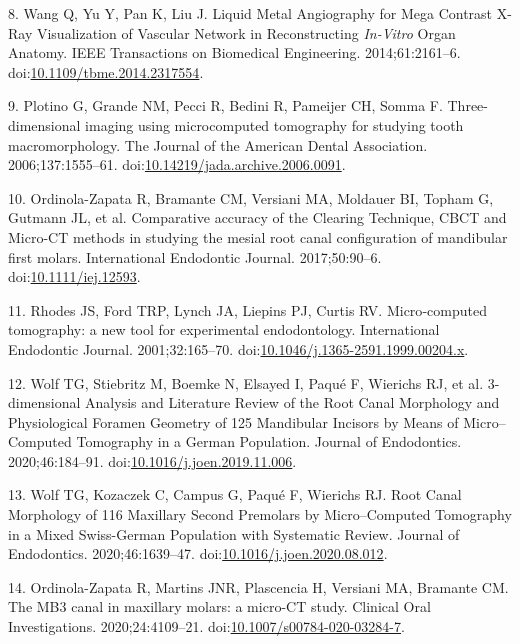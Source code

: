 \documentclass[
  american,
]{article}
\newenvironment{cslreferences}%
  {}%
  {\par}
\begin{document}
\begin{cslreferences}
\leavevmode\hypertarget{ref-6C8eCzkj}{}%
8. Wang Q, Yu Y, Pan K, Liu J. Liquid Metal Angiography for Mega Contrast X-Ray Visualization of Vascular Network in Reconstructing \emph{In-Vitro} Organ Anatomy. IEEE Transactions on Biomedical Engineering. 2014;61:2161--6. doi:\href{https://doi.org/10.1109/tbme.2014.2317554}{10.1109/tbme.2014.2317554}.

\leavevmode\hypertarget{ref-pTcCEU9H}{}%
9. Plotino G, Grande NM, Pecci R, Bedini R, Pameijer CH, Somma F. Three-dimensional imaging using microcomputed tomography for studying tooth macromorphology. The Journal of the American Dental Association. 2006;137:1555--61. doi:\href{https://doi.org/10.14219/jada.archive.2006.0091}{10.14219/jada.archive.2006.0091}.

\leavevmode\hypertarget{ref-PQ2tbZFC}{}%
10. Ordinola-Zapata R, Bramante CM, Versiani MA, Moldauer BI, Topham G, Gutmann JL, et al. Comparative accuracy of the Clearing Technique, CBCT and Micro-CT methods in studying the mesial root canal configuration of mandibular first molars. International Endodontic Journal. 2017;50:90--6. doi:\href{https://doi.org/10.1111/iej.12593}{10.1111/iej.12593}.

\leavevmode\hypertarget{ref-19T8cyNhk}{}%
11. Rhodes JS, Ford TRP, Lynch JA, Liepins PJ, Curtis RV. Micro‐computed tomography: a new tool for experimental endodontology. International Endodontic Journal. 2001;32:165--70. doi:\href{https://doi.org/10.1046/j.1365-2591.1999.00204.x}{10.1046/j.1365-2591.1999.00204.x}.

\leavevmode\hypertarget{ref-OttTicsv}{}%
12. Wolf TG, Stiebritz M, Boemke N, Elsayed I, Paqué F, Wierichs RJ, et al. 3-dimensional Analysis and Literature Review of the Root Canal Morphology and Physiological Foramen Geometry of 125 Mandibular Incisors by Means of Micro--Computed Tomography in a German Population. Journal of Endodontics. 2020;46:184--91. doi:\href{https://doi.org/10.1016/j.joen.2019.11.006}{10.1016/j.joen.2019.11.006}.

\leavevmode\hypertarget{ref-19SVNdOdA}{}%
13. Wolf TG, Kozaczek C, Campus G, Paqué F, Wierichs RJ. Root Canal Morphology of 116 Maxillary Second Premolars by Micro--Computed Tomography in a Mixed Swiss-German Population with Systematic Review. Journal of Endodontics. 2020;46:1639--47. doi:\href{https://doi.org/10.1016/j.joen.2020.08.012}{10.1016/j.joen.2020.08.012}.

\leavevmode\hypertarget{ref-RUBxFFUa}{}%
14. Ordinola-Zapata R, Martins JNR, Plascencia H, Versiani MA, Bramante CM. The MB3 canal in maxillary molars: a micro-CT study. Clinical Oral Investigations. 2020;24:4109--21. doi:\href{https://doi.org/10.1007/s00784-020-03284-7}{10.1007/s00784-020-03284-7}.


\end{cslreferences}
\end{document}
